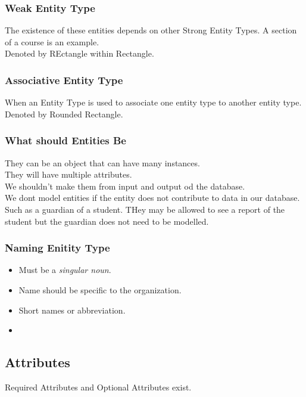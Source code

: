 \documentclass{article}
\begin{document}
            \subsubsection{Weak Entity Type}
                The existence of these entities depends on other Strong Entity Types. A section of a course is an example.\\
                Denoted by REctangle within Rectangle.
            \subsubsection{Associative Entity Type}
                When an Entity Type is used to associate one entity type to another entity type.\\
                Denoted by Rounded Rectangle.

            \subsubsection{What should Entities Be}
                They can be an object that can have many instances.\\
                They will have multiple attributes.\\
                We shouldn't make them from  input and output od the database.\\
                We dont model entities if the entity does not contribute to data in our database. Such as a guardian of a student. THey may be allowed to see a report of the student but the guardian does not need to be modelled.
            \subsubsection{Naming Enitity Type}
                \begin{itemize}
                    \item Must be a \emph{singular noun}.
                    \item Name should be specific to the organization.
                    \item Short names or abbreviation.
                    \item 
                \end{itemize}

        \subsection{Attributes}
            Required Attributes and Optional Attributes exist.
\end{document}
